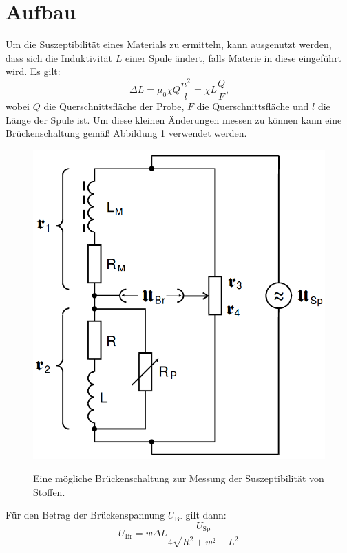 \section{Aufbau}
\label{sec:Aufbau}

Um die Suszeptibilität eines Materials zu ermitteln, kann ausgenutzt werden, dass sich die Induktivität $L$ einer Spule ändert, falls Materie in diese eingeführt wird. Es gilt:
\begin{equation}
	\Delta L = \mu_0 \chi Q \frac{n^2}{l}=\chi L \frac{Q}{F}\text{,}
\end{equation}
wobei $Q$ die Querschnittsfläche der Probe, $F$ die Querschnittsfläche und $l$ die Länge der Spule ist. Um diese kleinen Änderungen messen zu können kann eine Brückenschaltung gemäß Abbildung \ref{fig:Brueckenschaltung} verwendet werden.
\begin{figure}
	\centering
	\caption{Eine mögliche Brückenschaltung zur Messung der Suszeptibilität von Stoffen.}
	\includegraphics[width=\linewidth-70pt,height=\textwidth-200pt,keepaspectratio]{content/images/Brueckenschaltung.png}
	\label{fig:Brueckenschaltung}
\end{figure}
Für den Betrag der Brückenspannung $U_\text{Br}$ gilt dann:
\begin{equation}
	U_\text{Br} = w \Delta L \frac{U_\text{Sp}}{4 \sqrt{R^2+w^2+L^2}}
\end{equation}
